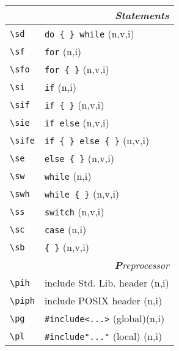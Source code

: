 \documentclass[oneside,11pt,landscape,DIV16]{scrartcl}
\begin{document}
\begin{multicols}{3}
\begin{center}
%
%
\begin{tabular}[]{|p{15mm}|p{55mm}|}
\hline
\multicolumn{2}{|r|}{\textsl{\textbf{S}tatements}} \\
\hline \verb'\sd'  & \verb'do { } while'        \hfill (n,v,i)\\
\hline \verb'\sf'  & \verb'for'                 \hfill (n,i)\\
\hline \verb'\sfo' & \verb'for { }'             \hfill (n,v,i)\\
\hline \verb'\si'  & \verb'if'                  \hfill (n,i)\\
\hline \verb'\sif' & \verb'if { }'              \hfill (n,v,i)\\
\hline \verb'\sie' & \verb'if else'             \hfill (n,v,i)\\
\hline \verb'\sife'& \verb'if { } else { }'     \hfill (n,v,i)\\
\hline \verb'\se'  & \verb'else { }'            \hfill (n,v,i)\\
\hline \verb'\sw'  & \verb'while'               \hfill (n,i)\\
\hline \verb'\swh' & \verb'while { }'           \hfill (n,v,i)\\
\hline \verb'\ss'  & \verb'switch'              \hfill (n,v,i)\\
\hline \verb'\sc'  & \verb'case'                \hfill (n,i)\\
\hline \verb'\sb'  & \verb'{ }'                 \hfill (n,v,i)\\
\hline
\hline
\multicolumn{2}{|r|}{\textsl{\textbf{P}reprocessor}}   \\
\hline \verb'\pih'  & include Std. Lib. header     \hfill (n,i)\\
\hline \verb'\piph' & include POSIX header         \hfill (n,i)\\
\hline \verb'\pg'   & \verb$#include<...>$ (global)\hfill (n,i)\\
\hline \verb'\pl'   & \verb$#include"..."$ (local) \hfill (n,i)\\

\end{tabular}
\end{center}
\end{multicols}
\end{document}
